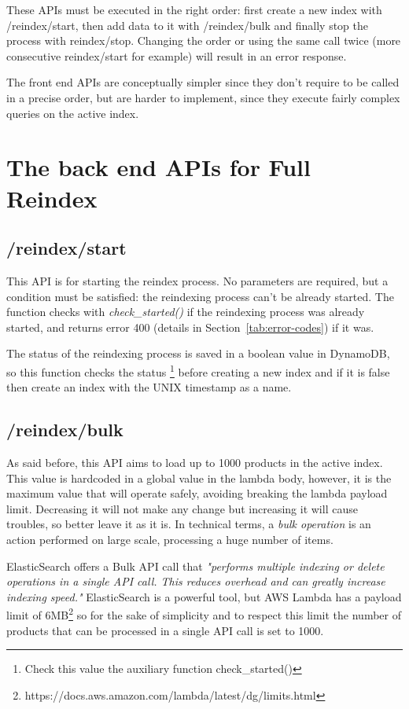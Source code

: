 These APIs must be executed in the right order: first create a new index with /reindex/start,
 then add data to it with /reindex/bulk and finally stop the process with reindex/stop. Changing
 the order or using the same call twice (more consecutive reindex/start for example) will result in an error response.

The front end APIs are conceptually simpler since they don't require to be called in a precise order,
but are harder to implement, since they execute fairly complex queries on the active index.



\section{The back end APIs for Full Reindex}
\label{sec:full}
\subsection{/reindex/start}
\label{sub:start}
This API is for starting the reindex process. No parameters are required,
but a condition must be satisfied: the reindexing process can't be already started.
The function checks with \textit{check\_started()} if the reindexing process was already started, and returns error 400
(details in Section~\ref{tab:error-codes}) if it was. 

The status of the reindexing process is saved in a boolean value in DynamoDB, so this function
checks the status \footnote{Check this value the auxiliary function check\_started()}
 before creating a new index and if it is false then create an index with the UNIX timestamp as a name.

\subsection{/reindex/bulk}
\label{sub:bulk}
As said before, this API aims to load up to 1000 products in the active index. 
This value is hardcoded in a global value in the lambda body, however, it is the maximum value
that will operate safely, avoiding breaking the lambda payload limit. Decreasing it will not make any change
but increasing it will cause troubles, so better leave it as it is.
In technical terms, a \textit{bulk operation} is an action performed on large scale,
processing a huge number of items. 

ElasticSearch offers a Bulk API call that
\textit{"performs multiple indexing or delete operations in a single API call. 
This reduces overhead and can greatly increase indexing speed."}\cite{bulk}
ElasticSearch is a powerful tool, but AWS Lambda has a payload limit of 6MB\label{payload}\footnote{https://docs.aws.amazon.com/lambda/latest/dg/limits.html} 
so for the sake of simplicity and to respect this limit the number of products that can be processed in a single API call 
is set to 1000.

